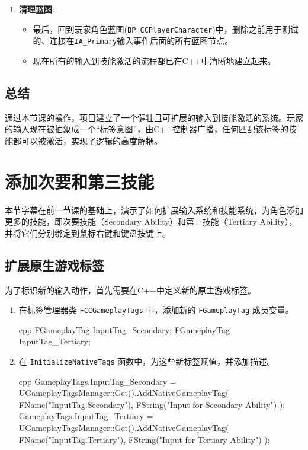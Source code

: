 \documentclass[10pt,CJKmath]{zhbook-v1}
\begin{document}
\begin{enumerate}
    \item \textbf{清理蓝图}:
    \begin{itemize}
        \item 最后，回到玩家角色蓝图(\texttt{BP\_CCPlayerCharacter})中，删除之前用于测试的、连接在\texttt{IA\_Primary}输入事件后面的所有蓝图节点。
        \item 现在所有的输入到技能激活的流程都已在C++中清晰地建立起来。
    \end{itemize}
\end{enumerate}

\subsection{总结}
通过本节课的操作，项目建立了一个健壮且可扩展的输入到技能激活的系统。玩家的输入现在被抽象成一个“标签意图”，由C++控制器广播，任何匹配该标签的技能都可以被激活，实现了逻辑的高度解耦。

\section{添加次要和第三技能}
本节字幕在前一节课的基础上，演示了如何扩展输入系统和技能系统，为角色添加更多的技能，即次要技能（Secondary Ability）和第三技能（Tertiary Ability），并将它们分别绑定到鼠标右键和键盘按键上。

\subsection{扩展原生游戏标签}
为了标识新的输入动作，首先需要在C++中定义新的原生游戏标签。
\begin{enumerate}
    \item 在标签管理器类 \texttt{FCCGameplayTags} 中，添加新的 \texttt{FGameplayTag} 成员变量。
    \begin{amzcode}{cpp}
    FGameplayTag InputTag_Secondary;
    FGameplayTag InputTag_Tertiary;
    \end{amzcode}
    \item 在 \texttt{InitializeNativeTags} 函数中，为这些新标签赋值，并添加描述。
    \begin{amzcode}{cpp}
    GameplayTags.InputTag_Secondary = UGameplayTagsManager::Get().AddNativeGameplayTag(
        FName("InputTag.Secondary"), FString("Input for Secondary Ability")
    );
    GameplayTags.InputTag_Tertiary = UGameplayTagsManager::Get().AddNativeGameplayTag(
        FName("InputTag.Tertiary"), FString("Input for Tertiary Ability")
    );
    \end{amzcode}
\end{enumerate}
\end{document}
